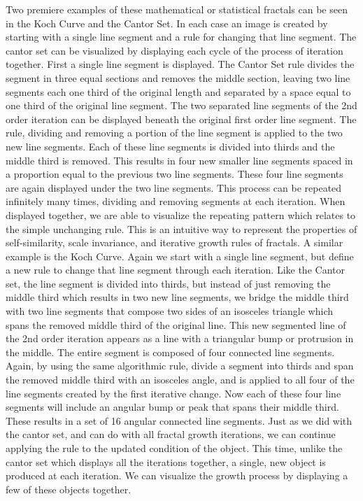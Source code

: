 \documentclass[english,jou]{apa6}
\begin{document}
Two premiere examples of these mathematical or statistical fractals can be seen in the Koch Curve and the Cantor Set. In each case an image is created by starting with a single line segment and a rule for changing that line segment. The cantor set can be visualized by displaying each cycle of the process of iteration together. First a single line segment is displayed. The Cantor Set rule divides the segment in three equal sections and removes the middle section, leaving two line segments each one third of the original length and separated by a space equal to one third of the original line segment. The two separated line segments of the 2nd order iteration can be displayed beneath the original first order line segment. The rule, dividing and removing a portion of the line segment is applied to the two new line segments. Each of these line segments is divided into thirds and the middle third is removed. This results in four new smaller line segments spaced in a proportion equal to the previous two line segments. These four line segments are again displayed under the two line segments. This process can be repeated infinitely many times, dividing and removing segments at each iteration. When displayed together, we are able to visualize the repeating pattern which relates to the simple unchanging rule. This is an intuitive way to represent the properties of self-similarity, scale invariance, and iterative growth rules of fractals. A similar example is the Koch Curve. Again we start with a single line segment, but define a new rule to change that line segment through each iteration. Like the Cantor set, the line segment is divided into thirds, but instead of just removing the middle third which results in two new line segments, we bridge the middle third with two line segments that compose two sides of an isosceles triangle which spans the removed middle third of the original line. This new segmented line of the 2nd order iteration appears as a line with a triangular bump or protrusion in the middle. The entire segment is composed of four connected line segments. Again, by using the same algorithmic rule, divide a segment into thirds and span the removed middle third with an isosceles angle, and is applied to all four of the line segments created by the first iterative change. Now each of these four line segments will include an angular bump or peak that spans their middle third. These results in a set of 16 angular connected line segments. Just as we did with the cantor set, and can do with all fractal growth iterations, we can continue applying the rule to the updated condition of the object. This time, unlike the cantor set which displays all the iterations together, a single, new object is produced at each iteration. We can visualize the growth process by displaying a few of these objects together.
\end{document}
